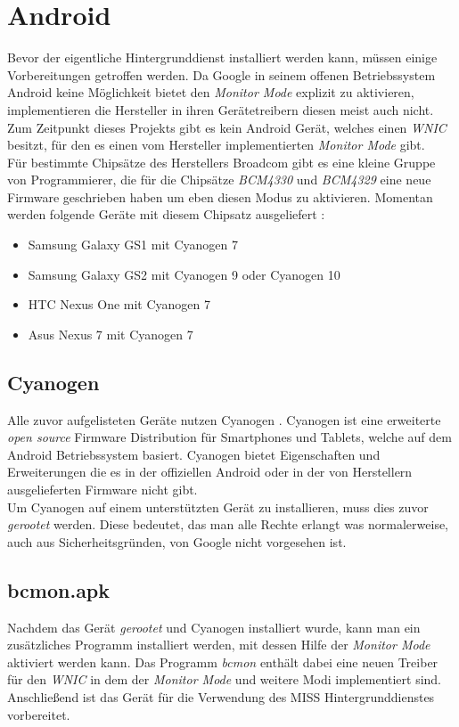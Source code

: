 \documentclass[]{report}
\begin{document}
\section{Android}
Bevor der eigentliche Hintergrunddienst installiert werden kann, müssen einige Vorbereitungen getroffen werden. Da Google in seinem offenen Betriebssystem Android keine Möglichkeit bietet den \textit{Monitor Mode} explizit zu aktivieren, implementieren die Hersteller in ihren Gerätetreibern diesen meist auch nicht.\\
Zum Zeitpunkt dieses Projekts gibt es kein Android Gerät, welches einen \textit{WNIC} besitzt, für den es einen vom Hersteller implementierten \textit{Monitor Mode} gibt. \\
Für bestimmte Chipsätze des Herstellers Broadcom \cite{Broadcom} gibt es eine kleine Gruppe von Programmierer, die für die Chipsätze \textit{BCM4330} \cite{BCM4330} und \textit{BCM4329} \cite{BCM4329} eine neue Firmware geschrieben haben um eben diesen Modus zu aktivieren. Momentan werden folgende Geräte mit diesem Chipsatz ausgeliefert \cite{bcmonBlog}:
\begin{itemize}
\item Samsung Galaxy GS1 mit Cyanogen 7
\item Samsung Galaxy GS2 mit Cyanogen 9 oder Cyanogen 10
\item HTC Nexus One mit Cyanogen 7
\item Asus Nexus 7 mit Cyanogen 7
\end{itemize}
\subsection{Cyanogen}
Alle zuvor aufgelisteten Geräte nutzen Cyanogen \cite{Cyanogen}. Cyanogen ist eine erweiterte \textit{open source} Firmware Distribution für Smartphones und Tablets, welche auf dem Android Betriebssystem basiert. Cyanogen bietet Eigenschaften und Erweiterungen die es in der offiziellen Android oder in der von Herstellern ausgelieferten Firmware nicht gibt. \\
Um Cyanogen auf einem unterstützten Gerät zu installieren, muss dies zuvor \textit{gerootet} werden. Diese bedeutet, das man alle Rechte erlangt was normalerweise, auch aus Sicherheitsgründen, von Google nicht vorgesehen ist. 
\subsection{bcmon.apk}
Nachdem das Gerät \textit{gerootet} und Cyanogen installiert wurde, kann man ein zusätzliches Programm installiert werden, mit dessen Hilfe der \textit{Monitor Mode} aktiviert werden kann. Das Programm \textit{bcmon} \cite{bcmon.apk} enthält dabei eine neuen Treiber für den \textit{WNIC} in dem der \textit{Monitor Mode} und weitere Modi implementiert sind. Anschließend ist das Gerät für die Verwendung des MISS Hintergrunddienstes vorbereitet. 
\end{document}
